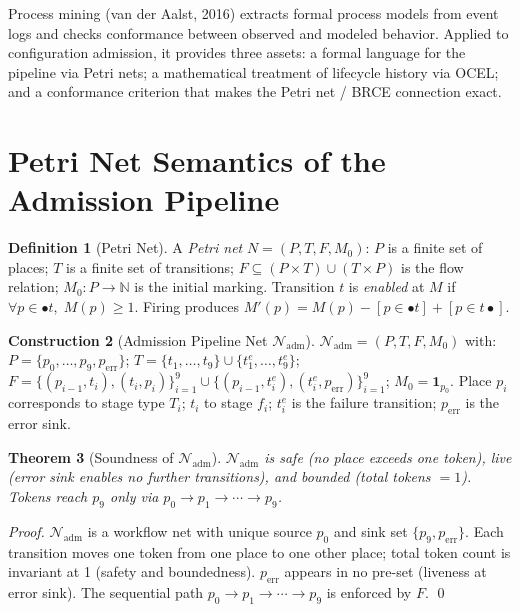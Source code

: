 \documentclass[12pt, letterpaper]{report}
\theoremstyle{plain}
\newtheorem{theorem}{Theorem}[chapter]
\theoremstyle{definition}
\newtheorem{definition}[theorem]{Definition}
\newtheorem{construction}[theorem]{Construction}
\theoremstyle{remark}
\newcommand{\N}{\mathbb{N}}
\newcommand{\NN}{\mathcal{N}}
\begin{document}
Process mining (van der Aalst, 2016) extracts formal process models from
event logs and checks conformance between observed and modeled behavior.
Applied to configuration admission, it provides three assets:
a formal language for the pipeline via Petri nets;
a mathematical treatment of lifecycle history via OCEL;
and a conformance criterion that makes the Petri net / BRCE connection exact.

\section{Petri Net Semantics of the Admission Pipeline}

\begin{definition}[Petri Net]
A \emph{Petri net} $N = (P, T, F, M_0)$: $P$ is a finite set of places;
$T$ is a finite set of transitions;
$F \subseteq (P \times T) \cup (T \times P)$ is the flow relation;
$M_0 : P \to \N$ is the initial marking.
Transition $t$ is \emph{enabled} at $M$ if $\forall p \in {\bullet}t,\; M(p) \geq 1$.
Firing produces $M'(p) = M(p) - [p \in {\bullet}t] + [p \in t{\bullet}]$.
\end{definition}

\begin{construction}[Admission Pipeline Net $\NN_{\mathrm{adm}}$]
\label{con:admission-net}
$\NN_{\mathrm{adm}} = (P, T, F, M_0)$ with:
$P = \{p_0, \ldots, p_9, p_{\mathrm{err}}\}$;
$T = \{t_1, \ldots, t_9\} \cup \{t_1^e, \ldots, t_9^e\}$;
$F = \{(p_{i-1},t_i),(t_i,p_i)\}_{i=1}^9 \cup \{(p_{i-1},t_i^e),(t_i^e,p_{\mathrm{err}})\}_{i=1}^9$;
$M_0 = \mathbf{1}_{p_0}$.
Place $p_i$ corresponds to stage type $T_i$; $t_i$ to stage $f_i$;
$t_i^e$ is the failure transition; $p_{\mathrm{err}}$ is the error sink.
\end{construction}

\begin{theorem}[Soundness of $\NN_{\mathrm{adm}}$]
$\NN_{\mathrm{adm}}$ is safe (no place exceeds one token), live (error sink
enables no further transitions), and bounded (total tokens $= 1$).
Tokens reach $p_9$ only via $p_0 \to p_1 \to \cdots \to p_9$.
\end{theorem}

\begin{proof}
$\NN_{\mathrm{adm}}$ is a workflow net with unique source $p_0$ and sink set
$\{p_9, p_{\mathrm{err}}\}$.
Each transition moves one token from one place to one other place;
total token count is invariant at 1 (safety and boundedness).
$p_{\mathrm{err}}$ appears in no pre-set (liveness at error sink).
The sequential path $p_0 \to p_1 \to \cdots \to p_9$ is enforced by $F$. \qed
\end{proof}
\end{document}
